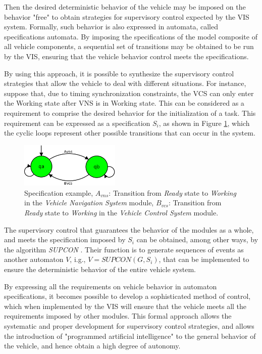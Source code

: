 \documentclass[conference]{IEEEtran}
\begin{document}
Then the desired deterministic behavior of the vehicle may be imposed on the behavior "free" to obtain strategies for supervisory control expected by the VIS system. Formally, such behavior is also expressed in automata, called specifications automata. By imposing the specifications of the model composite of all vehicle components, a sequential set of transitions may be obtained to be run by the VIS, ensuring that the vehicle behavior control meets the specifications.

By using this approach, it is possible to synthesize the supervisory control strategies that allow the vehicle to deal with different situations. For instance, suppose that, due to timing synchronization constraints, the VCS can only enter the Working state  after VNS is in Working state. This can be considered as a requirement to comprise the desired behavior for the initialization of a task. This requirement can be expressed as a specification $S_{i}$, as shown in Figure \ref{fig:VILMA_TRANSITION_EXAMPLE}, which the cyclic loops represent other possible transitions that can occur in the system.

\begin{figure}[h]
	\centering
	\includegraphics[width=180px,keepaspectratio]{imagens/VILMA_TRANSITION_EXAMPLE}
	\caption{Specification example, $A_{vns}$: Transition from \textit{Ready} state to \textit{Working} in the \textit{Vehicle Navigation System} module, $B_{vcs}$: Transition from \textit{Ready} state to \textit{Working} in the \textit{Vehicle Control System} module.}
	\label{fig:VILMA_TRANSITION_EXAMPLE}
\end{figure}

The supervisory control that guarantees the behavior of the modules as a whole, and meets the specification imposed by $S_{i}$ can be obtained, among other ways, by the algorithm \textit{SUPCON} \cite{supcom_wonham1987supremal}. Their function is to generate sequences of events as another automaton $V$, i.g., $V = SUPCON(G,S_{i})$, that can be implemented to ensure the deterministic behavior of the entire vehicle system.

By expressing all the requirements on vehicle behavior in automaton specifications, it becomes possible to develop a sophisticated method of control, which when implemented by the VIS will ensure that the vehicle meets all the requirements imposed by other modules. This formal approach allows the systematic and proper development for supervisory control strategies, and allows the introduction of "programmed artificial intelligence" to the general behavior of the vehicle, and hence obtain a high degree of autonomy.
\end{document}
